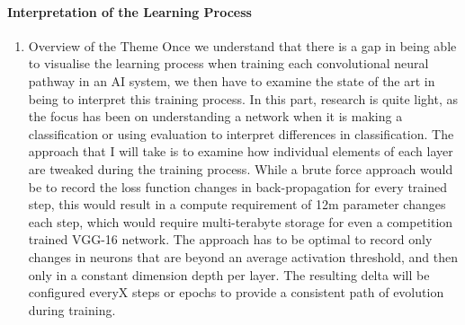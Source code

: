 \paragraph{Interpretation of the Learning Process}
\begin{enumerate}
    \item Overview of the Theme
    Once we understand that there is a gap in being able to visualise the learning process when training each convolutional neural pathway in an AI system, we then have to examine the state of the art in being to interpret this training process. In this part, research is quite light, as the focus has been on understanding a network when it is making a classification or using evaluation to interpret differences in classification. The approach that I will take is to examine how individual elements of each layer are tweaked during the training process. While a brute force approach would be to record the loss function changes in back-propagation for every trained step, this would result in a compute requirement of 12m parameter changes each step, which would require multi-terabyte storage for even a competition trained VGG-16 network. The approach has to be optimal to record only changes in neurons that are beyond an average activation threshold, and then only in a constant dimension depth per layer. The resulting delta will be configured everyX steps or epochs to provide a consistent path of evolution during training.


\end{enumerate}
